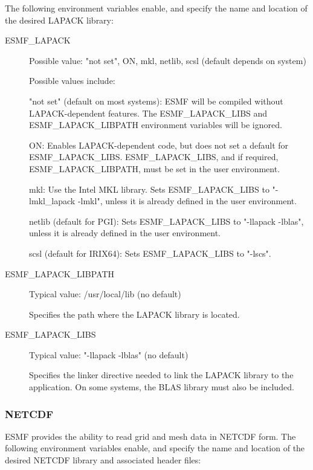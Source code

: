 The following environment variables enable, and specify the name and location of
the desired LAPACK library:
\begin{description}

\item[ESMF\_LAPACK] Possible value: "not set", ON, mkl, netlib, scsl (default depends on system)

Possible values include:

"not set" (default on most systems): ESMF will be compiled without
LAPACK-dependent features.  The ESMF\_LAPACK\_LIBS and ESMF\_LAPACK\_LIBPATH
environment variables will be ignored.

ON: Enables LAPACK-dependent code, but does not set a default for
ESMF\_LAPACK\_LIBS.  ESMF\_LAPACK\_LIBS, and if required, ESMF\_LAPACK\_LIBPATH,
must be set in the user environment.

mkl: Use the Intel MKL library.  Sets ESMF\_LAPACK\_LIBS to "-lmkl\_lapack -lmkl",
unless it is already defined in the user environment.

netlib (default for PGI): Sets ESMF\_LAPACK\_LIBS to "-llapack -lblas", unless
it is already defined in the user environment.

scsl (default for IRIX64): Sets ESMF\_LAPACK\_LIBS to "-lscs".


\item[ESMF\_LAPACK\_LIBPATH] Typical value: /usr/local/lib (no default)

Specifies the path where the LAPACK library is located.

\item[ESMF\_LAPACK\_LIBS] Typical value: "-llapack -lblas" (no default)

Specifies the linker directive needed to link the LAPACK library to
the application.  On some systems, the BLAS library must also be included.
\end{description}

\subsubsection{NETCDF}
ESMF provides the ability to read grid and mesh data in NETCDF form.  The
following environment variables enable, and specify the name and location
of the desired NETCDF library and associated header files:


